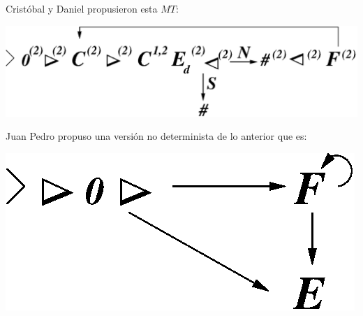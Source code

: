 \documentclass[dcc]{fcfmcourse}
\begin{document}
\begin{problems}
 Cristóbal y Daniel propusieron esta $MT$:
 \begin{center}
 \includegraphics[scale=0.8]{9P42.eps}
 \end{center}
 Juan Pedro propuso una versión no determinista de lo anterior que es:
 \begin{center}
 \includegraphics[scale=0.8]{9P43.eps}
 \end{center}
\end{problems}
\end{document}

